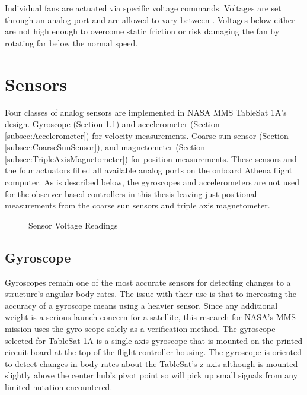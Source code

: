 Individual fans are actuated via specific voltage commands.  Voltages are set through an analog port and are allowed to vary between .  Voltages below  either are not high enough to overcome static friction or risk damaging the fan by rotating far below the normal speed.


\section{Sensors}
\label{sec:Sensors}

Four classes of analog sensors are implemented in NASA MMS TableSat 1A's design. Gyroscope (Section \ref{subsec:Gyroscope}) and accelerometer (Section \ref{subsec:Accelerometer}) for velocity measurements.  Coarse sun sensor (Section \ref{subsec:CoarseSunSensor}), and magnetometer (Section \ref{subsec:TripleAxisMagnetometer}) for position measurements.  These sensors and the four actuators filled all available analog ports on the onboard Athena flight computer.  As is described below, the gyroscopes and accelerometers are not used for the observer-based controllers in this thesis leaving just positional measurements from the coarse sun sensors and triple axis magnetometer.

\begin{figure}[H]
\centerline{}
\caption{Sensor Voltage Readings}
\label{fig:SensorVoltageReadings}
\end{figure}

\subsection{Gyroscope}
\label{subsec:Gyroscope}

Gyroscopes remain one of the most accurate sensors for detecting changes to a structure's angular body rates.  The issue with their use is that to increasing the accuracy of a gyroscope means using a heavier sensor.  Since any additional weight is a serious launch concern for a satellite, this research for NASA's MMS mission uses the gyro scope solely as a verification method.  The gyroscope selected for TableSat 1A is a single axis gyroscope that is mounted on the printed circuit board at the top of the flight controller housing.  The gyroscope is oriented to detect changes in body rates about the TableSat's z-axis although is mounted slightly above the center hub's pivot point so will pick up small signals from any limited nutation encountered.

